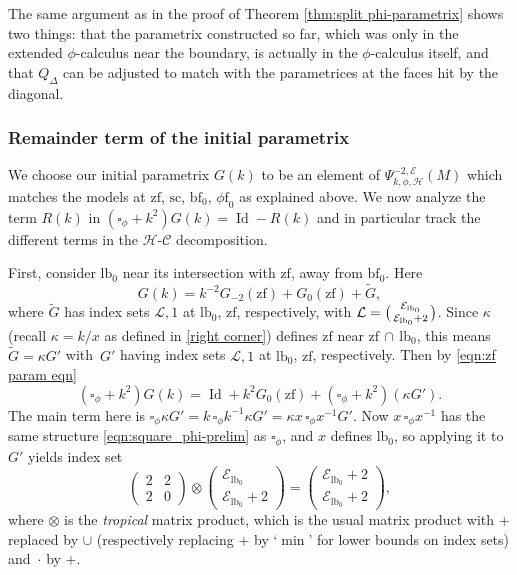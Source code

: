 \documentclass[JEP,XML,SOM,Unicode,NoFloatCountersInSection,published]{cedram}
\newenvironment{smallpmatrix}{\big(\begin{smallmatrix}}{\end{smallmatrix}\big)}
\theoremstyle{plain}
\theoremstyle{definition}
\newcommand\calE{{\mathcal E}}
\newcommand{\phif}{{\phi\mathrm{f}}}
\newcommand{\lf}{{\mathrm{lb}}}
\newcommand{\lfz}{{\mathrm{lb}_0}}
\newcommand{\bbf}{{\mathrm{bf}}}
\newcommand{\ssc}{{\mathrm{sc}}}
\newcommand{\zf}{{\mathrm{zf}}}
\DeclareMathOperator{\Id}{Id}
\newcommand{\Gtilde}{{\tilde{G}}}
\begin{document}
The same argument as in the proof of Theorem \ref{thm:split phi-parametrix} shows two things: that the parametrix constructed so far, which was only in the extended $\phi$-calculus near the boundary, is actually in the $\phi$-calculus itself, and that $Q_\Delta$ can be adjusted to match with the parametrices at the faces hit by the diagonal.

\subsubsection{Remainder term of the initial parametrix}
We choose our initial parametrix $G(k)$ to be an element of $\Psi^{-2,\calE}_{k,\phi,\mathscr{H}}(M)$ which matches the models at $\zf$, $\ssc$, $\bbf_0$, $\phif_0$ as explained above. We now analyze the term $R(k)$ in $(\square_\phi+k^2)G(k) = \Id - R(k)$ and in particular track the different terms in the $\mathscr{H}$-$\mathscr{C}$ decomposition.

First, consider $\lf_0$ near its intersection with $\zf$, away from $\bbf_0$. Here
\[
G(k) = k^{-2}G_{-2}(\zf) + G_0(\zf) + \Gtilde,
\]
where $\Gtilde$ has index sets $\mathcal{L},1$ at $\lfz$, $\zf$, respectively, with $\mathcal{L}=
\begin{smallpmatrix}
\calE_\lfz \\ \calE_\lfz+2
\end{smallpmatrix}$. Since $\kappa$ (recall $\kappa=k/x$ as defined in \eqref{right corner}) defines $\zf$ near $\zf \,\cap \,\lfz$, this means $\Gtilde=\kappa G'$ with~$G'$ having index sets $\mathcal{L},1$ at $\lfz$, $\zf$, respectively. Then by \eqref{eqn:zf param eqn}
\[
(\square_\phi+k^2)G(k) = \Id+k^2G_0(\zf) + (\square_\phi+k^2)(\kappa G').
\]
The main term here is $\square_\phi\kappa G' = k \,\square_\phi k^{-1}\kappa G' = \kappa x\,\square_\phi x^{-1} G'$. Now $x\,\square_\phi x^{-1}$ has the same structure \eqref{eqn:square_phi-prelim} as $\square_\phi$, and $x$ defines $\lfz$, so applying it to $G'$ yields index set
\begin{equation}
\label{eqn:tropical product}
\begin{pmatrix}
2 & 2 \\ 2 & 0
\end{pmatrix}
\otimes
\begin{pmatrix}
\calE_\lfz \\ \calE_\lfz+2
\end{pmatrix}
=
\begin{pmatrix}
\calE_\lfz +2\\ \calE_\lfz+2
\end{pmatrix},
\end{equation}
where $\otimes$ is the \emph{tropical} matrix product, which is the usual matrix product with $+$ replaced by $\cup$ (respectively replacing $+$ by `$\min$' for lower bounds on index sets) and~$\cdot$ by $+$.
\end{document}
